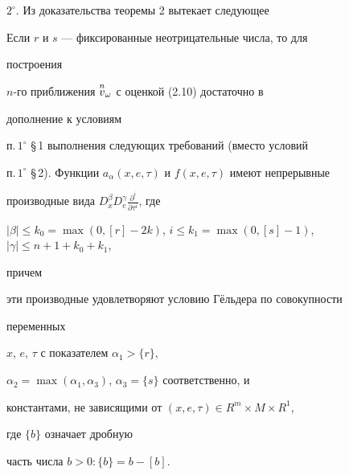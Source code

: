  


$2^\circ$. Из доказательства теоремы 2 вытекает следующее


 


\begin{notenonum} 


Если $r$ и $s$ --- фиксированные неотрицательные числа, то для 


построения 


$n$-го приближения $\overset{n}{v}{}_\omega$ с оценкой (2.10) достаточно в 


дополнение к условиям 


п.\,$1^\circ$ \S\,1 выполнения следующих требований (вместо условий 


п.\,$1^\circ$ \S\,2).
Функции $a_\alpha(x,e,\tau)$ и $f(x,e,\tau)$ имеют непрерывные 


производные вида $D^\beta_x 


D^\gamma_e\frac{\partial^i}{\partial\tau^i}$, где 


$|\beta|\le k_0=\max(0,[r]-2k)$, $i\le k_1=\max(0,[s]-1)$, $|\gamma|\le 


n+1+k_0+k_1$, 


причем 


эти производные удовлетворяют условию Г\"ельдера по совокупности 


переменных 


$x$, $e$, $\tau$ с показателем $\alpha_1>\{r\}$, 


$\alpha_2=\max(\alpha_1,\alpha_3)$, $\alpha_3=\{s\}$ соответственно, и 


константами, не зависящими от $(x,e,\tau)\in R^m\times M\times R^1$, 


где $\{b\}$ означает дробную 


часть числа $b>0:\{b\}=b-[b]$. 


\end{notenonum}


 


